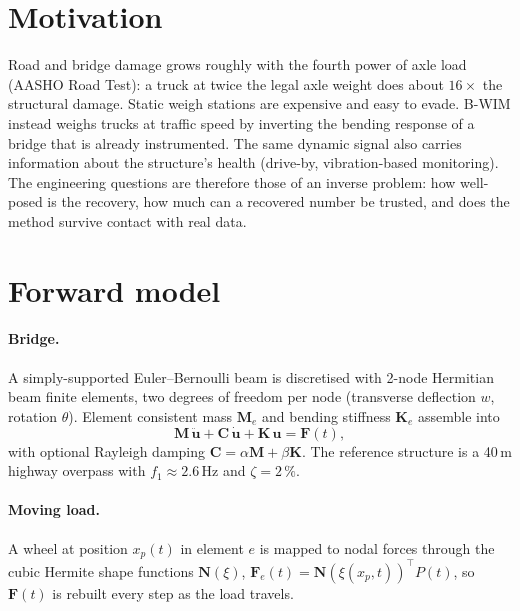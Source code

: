 \documentclass[11pt,a4paper]{article}
\begin{document}
\section{Motivation}
Road and bridge damage grows roughly with the fourth power of axle load (AASHO Road Test): a
truck at twice the legal axle weight does about $16\times$ the structural damage. Static weigh
stations are expensive and easy to evade. B-WIM instead weighs trucks at traffic speed by
inverting the bending response of a bridge that is already instrumented. The same dynamic signal
also carries information about the structure's health (drive-by, vibration-based monitoring). The
engineering questions are therefore those of an inverse problem: how well-posed is the recovery,
how much can a recovered number be trusted, and does the method survive contact with real data.

\section{Forward model}
\paragraph{Bridge.} A simply-supported Euler--Bernoulli beam is discretised with 2-node Hermitian
beam finite elements, two degrees of freedom per node (transverse deflection $w$, rotation
$\theta$). Element consistent mass $\mathbf{M}_e$ and bending stiffness $\mathbf{K}_e$ assemble
into
\begin{equation}
  \mathbf{M}\,\ddot{\mathbf{u}} + \mathbf{C}\,\dot{\mathbf{u}} + \mathbf{K}\,\mathbf{u}
  = \mathbf{F}(t),
  \label{eq:eom}
\end{equation}
with optional Rayleigh damping $\mathbf{C}=\alpha\mathbf{M}+\beta\mathbf{K}$. The reference
structure is a 40\,m highway overpass with $f_1\approx 2.6\,$Hz and $\zeta = 2\,\%$.

\paragraph{Moving load.} A wheel at position $x_p(t)$ in element $e$ is mapped to nodal forces
through the cubic Hermite shape functions $\mathbf{N}(\xi)$,
$\mathbf{F}_e(t) = \mathbf{N}(\xi(x_p,t))^{\top} P(t)$, so $\mathbf{F}(t)$ is rebuilt every step
as the load travels.
\end{document}
